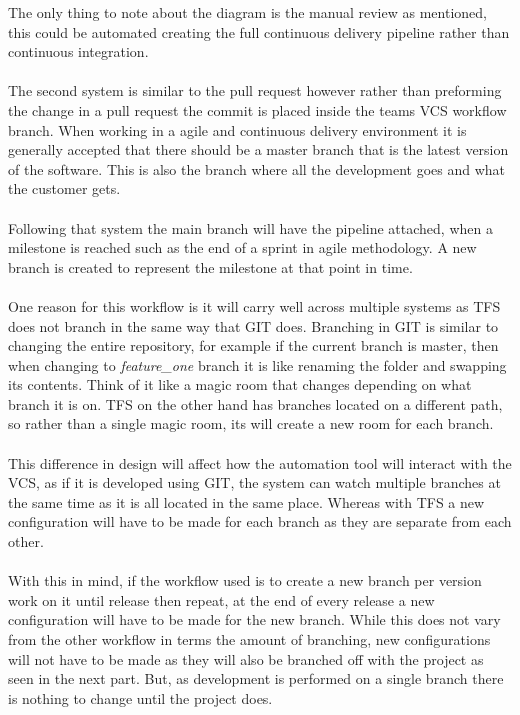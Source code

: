 The only thing to note about the diagram is the manual review as mentioned, this could be automated creating the full continuous delivery pipeline rather than continuous integration.
\\\\
The second system is similar to the pull request however rather than preforming the change in a pull request the commit is placed inside the teams VCS workflow branch. When working in a agile and continuous delivery environment it is generally accepted that there should be a master branch that is the latest version of the software. This is also the branch where all the development goes and what the customer gets.
\\\\
Following that system the main branch will have the pipeline attached, when a milestone is reached such as the end of a sprint in agile methodology. A new branch is created to represent the milestone at that point in time. 
\\\\
One reason for this workflow is it will carry well across multiple systems as TFS does not branch in the same way that GIT does. Branching in GIT is similar to changing the entire repository, for example if the current branch is master, then when changing to \textit{feature\_one} branch it is like renaming the folder and swapping its contents. Think of it like a magic room that changes depending on what branch it is on. TFS on the other hand has branches located on a different path, so rather than a single magic room, its will create a new room for each branch.
\\\\
This difference in design will affect how the automation tool will interact with the VCS, as if it is developed using GIT, the system can watch multiple branches at the same time as it is all located in the same place. Whereas with TFS a new configuration will have to be made for each branch as they are separate from each other.
\\\\
With this in mind, if the workflow used is to create a new branch per version work on it until release then repeat, at the end of every release a new configuration will have to be made for the new branch. While this does not vary from the other workflow in terms the amount of branching, new configurations will not have to be made as they will also be branched off with the project as seen in the next part. But, as development is performed on a single branch there is nothing to change until the project does.
